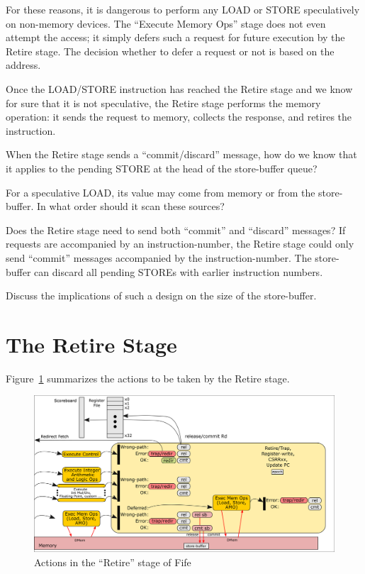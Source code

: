 For these reasons, it is dangerous to perform any LOAD or STORE
speculatively on non-memory devices.  The ``Execute Memory Ops'' stage
does not even attempt the access; it simply defers such a request for
future execution by the Retire stage.  The decision whether to defer a
request or not is based on the address.

Once the LOAD/STORE instruction has reached the Retire stage and we
know for sure that it is not speculative, the Retire stage performs
the memory operation: it sends the request to memory, collects the
response, and retires the instruction.


\hdivider

\Exercise

When the Retire stage sends a ``commit/discard'' message, how do we
know that it applies to the pending STORE at the head of the
store-buffer queue?

\Exercise

For a speculative LOAD, its value may come from memory or from the
store-buffer.  In what order should it scan these sources?

\Exercise

Does the Retire stage need to send both ``commit'' and ``discard''
messages?  If requests are accompanied by an instruction-number, the
Retire stage could only send ``commit'' messages accompanied by the
instruction-number.  The store-buffer can discard all pending STOREs
with earlier instruction numbers.

Discuss the implications of such a design on the size of the store-buffer.

\Endexercise


\section{The Retire Stage}

\label{Sec_Fife_Retire_Principles}

Figure~\ref{Fig_Fife_Retire} summarizes the actions to be taken by the
Retire stage.
\begin{figure}[htbp]
  \centerline{\includegraphics[width=6in,angle=0]{Figures/Fig_Fife_Retire}}
  \caption{\label{Fig_Fife_Retire}Actions in the ``Retire'' stage of Fife}
\end{figure}


